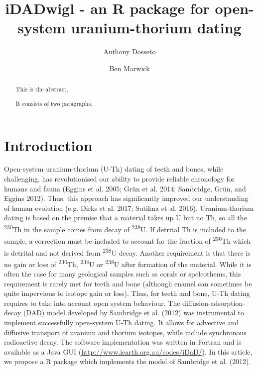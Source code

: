 \documentclass[]{elsarticle} %
\begin{document}
\begin{frontmatter}

  \title{iDADwigl - an R package for open-system uranium-thorium dating}
    \author[University of Wollongong]{Anthony Dosseto}
    \author[University of Washington]{Ben Marwick}
  
      \address[Some Institute of Technology]{Wollongong Isotope Geochronology Laboratory, School of Earth \& Envrionmental Sciences, University of Wollongong, Wollongong NSW Australia}
    \address[University of Washington]{Department of Anthropology, University of Washington, Seattle, WA, USA}
  
  \begin{abstract}
  This is the abstract.
  
  It consists of two paragraphs.
  \end{abstract}
  
 \end{frontmatter}

\newpage
\linenumbers

\hypertarget{introduction}{%
\section{Introduction}\label{introduction}}

Open-system uranium-thorium (U-Th) dating of teeth and bones, while challenging, has revolutionised our ability to provide reliable chronology for humans and fauna (Eggins et al. 2005; Grün et al. 2014; Sambridge, Grün, and Eggins 2012). Thus, this approach has significantly improved our understanding of human evolution (e.g. Dirks et al. 2017; Sutikna et al. 2016). Uranium-thorium dating is based on the premise that a material takes up U but no Th, so all the \textsuperscript{230}Th in the sample comes from decay of \textsuperscript{238}U. If detrital Th is included to the sample, a correction must be included to account for the fraction of \textsuperscript{230}Th which is detrital and not derived from \textsuperscript{238}U decay. Another requirement is that there is no gain or loss of \textsuperscript{230}Th, \textsuperscript{234}U or \textsuperscript{238}U after formation of the material. While it is often the case for many geological samples such as corals or speleothems, this requirement is rarely met for teeth and bone (although enamel can sometimes be quite impervious to isotope gain or loss). Thus, for teeth and bone, U-Th dating requires to take into account open system behaviour. The diffusion-adsorption-decay (DAD) model developed by Sambridge et al. (2012) was instrumental to implement successfully open-system U-Th dating. It allows for advective and diffusive transport of uranium and thorium isotopes, while include synchronous radioactive decay. The software implementation was written in Fortran and is available as a Java GUI (\url{http://www.iearth.org.au/codes/iDaD/}). In this article, we propose a R package which implements the model of Sambridge et al. (2012).
\end{document}

